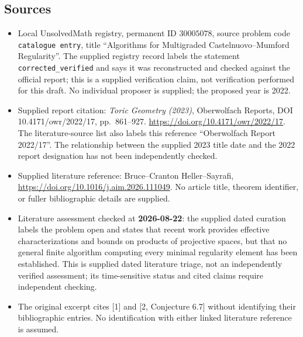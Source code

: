 \documentclass[11pt]{article}
\begin{document}
\subsection{Sources}
\begin{itemize}
\item Local UnsolvedMath registry, permanent ID \(30005078\), source problem code \texttt{catalogue entry}, title ``Algorithms for Multigraded Castelnuovo--Mumford Regularity''. The supplied registry record labels the statement \texttt{corrected\_verified} and says it was reconstructed and checked against the official report; this is a supplied verification claim, not verification performed for this draft. No individual proposer is supplied; the proposed year is 2022.
\item Supplied report citation: \emph{Toric Geometry (2023)}, Oberwolfach Reports, DOI 10.4171/owr/2022/17, pp.\ 861--927. \url{https://doi.org/10.4171/owr/2022/17}. The literature-source list also labels this reference ``Oberwolfach Report 2022/17''. The relationship between the supplied 2023 title date and the 2022 report designation has not been independently checked.
\item Supplied literature reference: Bruce--Cranton Heller--Sayrafi, \url{https://doi.org/10.1016/j.aim.2026.111049}. No article title, theorem identifier, or fuller bibliographic details are supplied.
\item Literature assessment checked at \textbf{2026-08-22}: the supplied dated curation labels the problem open and states that recent work provides effective characterizations and bounds on products of projective spaces, but that no general finite algorithm computing every minimal regularity element has been established. This is supplied dated literature triage, not an independently verified assessment; its time-sensitive status and cited claims require independent checking.
\item The original excerpt cites [1] and [2, Conjecture 6.7] without identifying their bibliographic entries. No identification with either linked literature reference is assumed.
\end{itemize}
\end{document}
